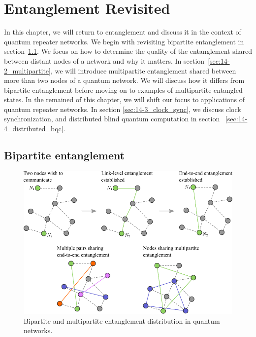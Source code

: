 \chapter{Entanglement Revisited}

In this chapter, we will return to entanglement and discuss it in the context of quantum repeater networks.
We begin with revisiting bipartite entanglement in section~\ref{sec:14-1_bipartite}.
We focus on how to determine the quality of the entanglement shared between distant nodes of a network and why it matters.
In section~\ref{sec:14-2_multipartite}, we will introduce multipartite entanglement shared between more than two nodes of a quantum network.
We will discuss how it differs from bipartite entanglement before moving on to examples of multipartite entangled states.
In the remained of this chapter, we will shift our focus to applications of quantum repeater networks.
In section \ref{sec:14-3_clock_sync}, we discuss clock synchronization, and distributed blind quantum computation in section ~\ref{sec:14-4_distributed_bqc}.



\section{Bipartite entanglement}
\label{sec:14-1_bipartite}

\begin{figure}[t]
    \centering
    \includegraphics[width=\textwidth]{lesson14/14-1_bipartite_network.pdf}
    \caption[Bipartite and multipartite entanglement]{Bipartite and multipartite entanglement distribution in quantum networks.}
    \label{fig:14-1_bipartite_multipartite}
\end{figure}


